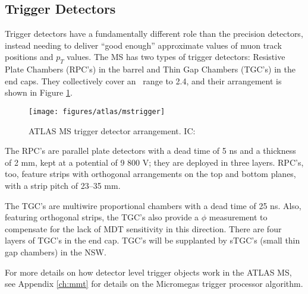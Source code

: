 \subsection{Trigger Detectors}
Trigger detectors have a fundamentally different role than the precision detectors, instead needing to deliver ``good enough'' approximate values of muon track positions and $p_T$ values.  The MS has two types of trigger detectors: Resistive Plate Chambers (RPC's) in the barrel and Thin Gap Chambers (TGC's) in the end caps.  They collectively cover an \aeta\, range to 2.4, and their arrangement is shown in Figure \ref{fig:mstrig}.

\begin{figure}[!htbp]\captionsetup{justification=centering}
  \centering
  \texttt{[image: figures/atlas/mstrigger]}
  \caption{ATLAS MS trigger detector arrangement.  IC: \cite{jinstpaper}}
  \label{fig:mstrig}
\end{figure}

The RPC's are parallel plate detectors with a dead time of 5 ns and a thickness of 2 mm, kept at a potential of 9 800 V; they are deployed in three layers.  RPC's, too, feature strips with orthogonal arrangements on the top and bottom planes, with a strip pitch of 23--35 mm.  

The TGC's are multiwire proportional chambers with a dead time of 25 ns.  Also, featuring orthogonal strips, the TGC's also provide a $\phi$ measurement to compensate for the lack of MDT sensitivity in this direction.  There are four layers of TGC's in the end cap.  TGC's will be supplanted by sTGC's (small thin gap chambers) in the NSW.

For more details on how detector level trigger objects work in the ATLAS MS, see Appendix \ref{ch:mmt} for details on the Micromegas trigger processor algorithm.

